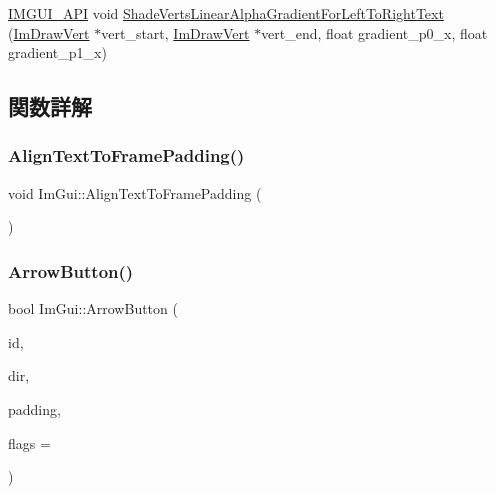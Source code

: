 \begin{DoxyCompactItemize}
\item 
\mbox{\hyperlink{imgui_8h_a43829975e84e45d1149597467a14bbf5}{I\+M\+G\+U\+I\+\_\+\+A\+PI}} void \mbox{\hyperlink{namespace_im_gui_a73b4d230c8fffd2a07d799cd9d4e2a03}{Shade\+Verts\+Linear\+Alpha\+Gradient\+For\+Left\+To\+Right\+Text}} (\mbox{\hyperlink{struct_im_draw_vert}{Im\+Draw\+Vert}} $\ast$vert\+\_\+start, \mbox{\hyperlink{struct_im_draw_vert}{Im\+Draw\+Vert}} $\ast$vert\+\_\+end, float gradient\+\_\+p0\+\_\+x, float gradient\+\_\+p1\+\_\+x)
\end{DoxyCompactItemize}


\subsection{関数詳解}
\mbox{\label{namespace_im_gui_ae14be3a3bec106de7c91aaa2a9a558a1}} 
\subsubsection{\texorpdfstring{Align\+Text\+To\+Frame\+Padding()}{AlignTextToFramePadding()}}
{\footnotesize\ttfamily void Im\+Gui\+::\+Align\+Text\+To\+Frame\+Padding (\begin{DoxyParamCaption}{ }\end{DoxyParamCaption})}

\mbox{\label{namespace_im_gui_ac7c2bd67d2bb2d8ee4b583b1576a0bd3}} 
\subsubsection{\texorpdfstring{Arrow\+Button()}{ArrowButton()}}
{\footnotesize\ttfamily bool Im\+Gui\+::\+Arrow\+Button (\begin{DoxyParamCaption}\item[{\mbox{\hyperlink{imgui_8h_a1785c9b6f4e16406764a85f32582236f}{Im\+Gui\+ID}}}]{id,  }\item[{\mbox{\hyperlink{imgui__internal_8h_a4b8427c5153ae1d43278dc397d809335}{Im\+Gui\+Dir}}}]{dir,  }\item[{\mbox{\hyperlink{struct_im_vec2}{Im\+Vec2}}}]{padding,  }\item[{\mbox{\hyperlink{imgui__internal_8h_a990fae518aa1d95f571ee40989de4c22}{Im\+Gui\+Button\+Flags}}}]{flags = {} }\end{DoxyParamCaption})}

